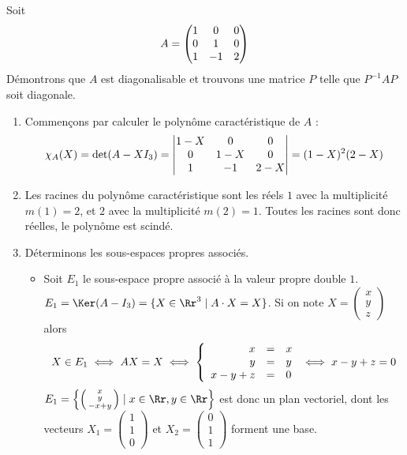 \documentclass[12pt, class=report,crop=false]{standalone}
\begin{document}
\begin{exemple}
Soit $$A=\left(\begin{matrix}1&0&0\cr0&1&0\cr1&-1&2\end{matrix}\right)$$
Démontrons que $A$ est diagonalisable et trouvons une matrice $P$ telle que $P^{-1}AP$ soit diagonale.


\begin{enumerate}
  \item Commençons par calculer le polynôme caractéristique de $A$ :
$$\chi_A(X)
= \det(A-XI_3) 
= \begin{vmatrix}1-X&0&0\cr 0&1-X&0\cr1&-1&2-X\end{vmatrix}
=(1-X)^2(2-X)$$
  
  \item Les racines du polynôme caractéristique sont les réels $1$ avec la multiplicité $m(1)=2$, 
  et $2$ avec la multiplicité $m(2)=1$. Toutes les racines sont donc réelles, le polynôme est scindé.

  
  \item Déterminons les sous-espaces propres associés.
  \begin{itemize}
    \item Soit $E_1$ le sous-espace propre associé à la valeur propre double $1$.
$E_1 = \Ker(A-I_3) = \{X \in \Rr^3 \mid A \cdot X=X\}$.
Si on note $X = \left(\begin{smallmatrix}x\\y\\z\end{smallmatrix}\right)$ alors
$$X\in E_1\iff AX=X \iff \left\{\begin{array}{rcl}
x&=&x\cr 
y&=&y\cr 
x-y+z&=&0
\end{array}\right.\iff x-y+z = 0$$
$E_1 = \left\lbrace\left(\begin{smallmatrix}x\\y\\-x+y\end{smallmatrix}\right) \mid x \in \Rr, y\in \Rr\right\rbrace$ est donc un plan vectoriel, dont les vecteurs 
$X_1=\left(\begin{smallmatrix}1\\1\\0\end{smallmatrix}\right)$ et 
$X_2=\left(\begin{smallmatrix}0\\1\\1\end{smallmatrix}\right)$ forment une base.


\end{itemize}
\end{enumerate}
\end{exemple}
\end{document}
